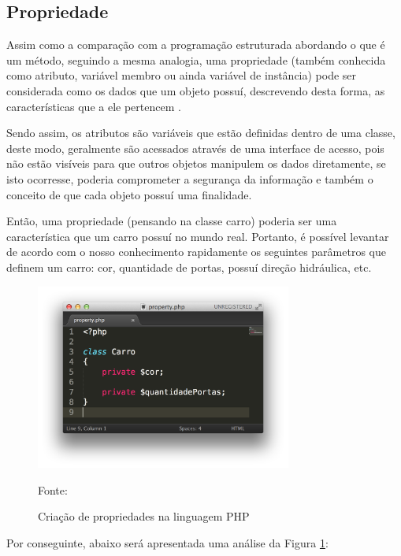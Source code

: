 \subsection{Propriedade}
Assim como a comparação com a programação estruturada abordando o que é um
método, seguindo a mesma analogia, uma propriedade (também conhecida como
atributo, variável membro ou ainda variável de instância) pode ser considerada
como os dados que um objeto possuí, descrevendo desta forma, as características
que a ele pertencem \cite{programmingPhp}.

Sendo assim, os atributos são variáveis que estão definidas dentro de uma
classe, deste modo, geralmente são acessados através de uma interface de acesso,
pois não estão visíveis para que outros objetos manipulem os dados diretamente,
se isto ocorresse, poderia comprometer a segurança da informação e também o
conceito de que cada objeto possuí uma finalidade.

Então, uma propriedade (pensando na classe carro) poderia ser uma característica
que um carro possuí no mundo real. Portanto, é possível levantar de acordo com
o nosso conhecimento rapidamente os seguintes parâmetros que definem um carro:
cor, quantidade de portas, possuí direção hidráulica, etc.

\begin{figure}[h!tb]
	\caption{Criação de propriedades na linguagem PHP}
	\label{fig:propriedade}

	\centering
	\includegraphics[width=0.75\textwidth]{images/property.png}

	\centering
	\footnotesize Fonte: \fonteOAutor
\end{figure}

\FloatBarrier 	%

Por conseguinte, abaixo será apresentada uma análise da Figura
\ref{fig:propriedade}:

